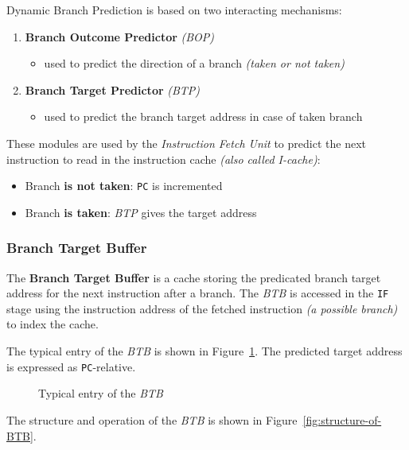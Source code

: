 \documentclass[english]{article}
\begin{document}
\bigskip
Dynamic Branch Prediction is based on two interacting mechanisms:

\begin{enumerate}
  \item \textbf{Branch Outcome Predictor} \textit{(BOP)}
        \begin{itemize}
          \item used to predict the direction of a branch \textit{(taken or not taken)}
        \end{itemize}
  \item \textbf{Branch Target Predictor} \textit{(BTP)}
        \begin{itemize}
          \item used to predict the branch target address in case of taken branch
        \end{itemize}
\end{enumerate}

These modules are used by the \textit{Instruction Fetch Unit} to predict the next instruction to read in the instruction cache \textit{(also called I-cache)}:

\begin{itemize}
  \item Branch \textbf{is not taken}: \texttt{PC} is incremented
  \item Branch \textbf{is taken}: \textit{BTP} gives the target address
\end{itemize}

\subsubsection{Branch Target Buffer}

The \textbf{Branch Target Buffer} is a cache storing the predicated branch target address for the next instruction after a branch.
The \textit{BTB} is accessed in the \texttt{IF} stage using the instruction address of the fetched instruction \textit{(a possible branch)} to index the cache.

The typical entry of the \textit{BTB} is shown in Figure~\ref{fig:typical-entry-BTB}.
The predicted target address is expressed as \texttt{PC}-relative.

\begin{figure}[htbp]
  \bigskip
  \centering
  \caption{Typical entry of the \textit{BTB}}
  \label{fig:typical-entry-BTB}
  \bigskip
\end{figure}

The structure and operation of the \textit{BTB} is shown in Figure~\ref{fig:structure-of-BTB}.
\end{document}
